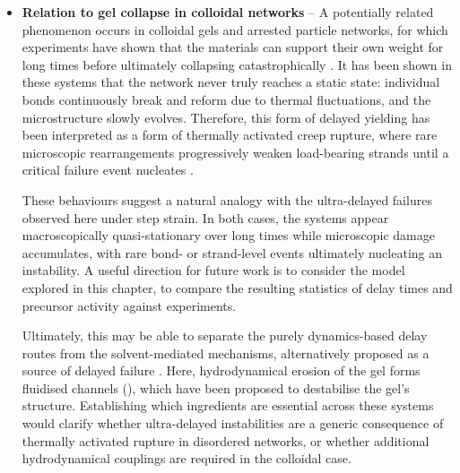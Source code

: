\documentclass[asymmetricmargins]{library/duthesis}%
\begin{document}
\begin{itemize}
    \item {\bf Relation to gel collapse in colloidal networks} -- A potentially related phenomenon occurs in colloidal gels and arrested particle networks, for which experiments have shown that the materials can support their own weight for long times before ultimately collapsing catastrophically \cite{harich_gravitational_2016,bartlett_sudden_2012,manley_gravitational_2005,starrs_collapse_2002}. It has been shown in these systems that the network never truly reaches a static state: individual bonds continuously break and reform due to thermal fluctuations, and the microstructure slowly evolves. Therefore, this form of delayed yielding has been interpreted as a form of thermally activated creep rupture, where rare microscopic rearrangements progressively weaken load-bearing strands until a critical failure event nucleates \cite{blindstrom_structures_2012,teece_gels_2014,sprakel_stress_2011}.

    These behaviours suggest a natural analogy with the ultra-delayed failures observed here under step strain. In both cases, the systems appear macroscopically quasi-stationary over long times while microscopic damage accumulates, with rare bond- or strand-level events ultimately nucleating an instability. A useful direction for future work is to consider the model explored in this chapter, to compare the resulting statistics of delay times and precursor activity against experiments.

    Ultimately, this may be able to separate the purely dynamics-based delay routes from the solvent-mediated mechanisms, alternatively proposed as a source of delayed failure \cite{harich_gravitational_2016,varga_modelling_2018,padmanabhan_gravitational_2018}. Here, hydrodynamical erosion of the gel forms fluidised channels (), which have been proposed to destabilise the gel's structure. Establishing which ingredients are essential across these systems would clarify whether ultra-delayed instabilities are a generic consequence of thermally activated rupture in disordered networks, or whether additional hydrodynamical couplings are required in the colloidal case.


\end{itemize}
\end{document}
